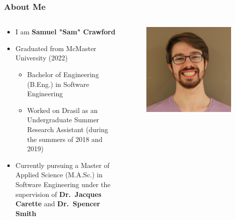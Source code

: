\documentclass{beamer}
\begin{document}
\begin{frame}
    \frametitle{About Me}
    \begin{columns}[T,onlytextwidth]
        \begin{column}{.675\textwidth}
            \begin{minipage}{\textwidth}
                \begin{itemize}
                    \item I am \textbf{Samuel "Sam" Crawford}
                    \item<2-> Graduated from McMaster University (2022)
                        \begin{itemize}
                            \item Bachelor of Engineering (B.Eng.) in Software Engineering
                            \item Worked on Drasil as an Undergraduate Summer Research Assistant
                                  (during the summers of 2018 and 2019)
                        \end{itemize}
                    \item<3-> Currently pursuing a Master of Applied Science (M.A.Sc.) in Software
                        Engineering under the supervision of \textbf{Dr.~Jacques Carette} and \textbf{Dr.~Spencer Smith}
                \end{itemize}
            \end{minipage}
        \end{column}
        \begin{column}{.3\textwidth}
            \begin{figure}
                \includegraphics[width=.8\textwidth]{assets/me.jpg}
            \end{figure}
        \end{column}
    \end{columns}
\end{frame}
\end{document}
